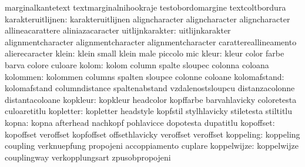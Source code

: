                            marginalkantetext         textmarginalnihookraje
                           testobordomargine         textcoltbordura
        karakteruitlijnen: karakteruitlijnen         aligncharacter
                           aligncharacter            aligncharacter
                           allineacarattere          aliniazacaracter %
          uitlijnkarakter: uitlijnkarakter           alignmentcharacter
                           alignmentcharacter        alignmentcharacter
                           carattereallineamento     alierecaracter %
                    klein: klein                     small
                           klein                     male
                           piccolo                   mic
                    kleur: kleur                     color
                           farbe                     barva
                           colore                    culoare
                    kolom: kolom                     column
                           spalte                    sloupec
                           colonna                   coloana
                 kolommen: kolommen                  columns
                           spalten                   sloupce
                           colonne                   coloane
             kolomafstand: kolomafstand              columndistance
                           spaltenabstand            vzdalenostsloupcu
                           distanzacolonne           distantacoloane
                 kopkleur: kopkleur                  headcolor
                           kopffarbe                 barvahlavicky
                           coloretesta               culoaretitlu
                kopletter: kopletter                 headstyle
                           kopfstil                  stylhlavicky
                           stiletesta                stiltitlu
                    kopna: kopna                     afterhead
                           nachkopf                  pohlavicce
                           dopotesta                 dupatitlu
                kopoffset: kopoffset                 veroffset
                           kopfoffset                offsethlavicky
                           veroffset                 veroffset %
                koppeling: koppeling                 coupling
                           verknuepfung              propojeni
                           accoppiamento             cuplare
              koppelwijze: koppelwijze               couplingway
                           verkopplungsart           zpusobpropojeni
